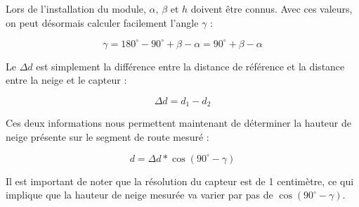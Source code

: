 Lors de l'installation du module, $\alpha$, $\beta$ et $h$ doivent être connus. Avec ces valeurs, on
peut désormais calculer facilement l'angle $\gamma$ :

\[\gamma = 180^{\circ} - 90^{\circ} + \beta - \alpha = 90^{\circ} + \beta - \alpha\]

Le $\Delta d$ est simplement la différence entre la distance de référence et la distance entre la
neige et le capteur :

\[\Delta d = d_1 - d_2\]

Ces deux informations nous permettent maintenant de déterminer la hauteur de neige présente sur le
segment de route mesuré :

\[d = \Delta d * \cos{(90^{\circ} - \gamma)}\]

Il est important de noter que la résolution du capteur est de 1 centimètre, ce qui implique que la
hauteur de neige mesurée va varier par pas de $\cos{(90^{\circ} - \gamma)}$.